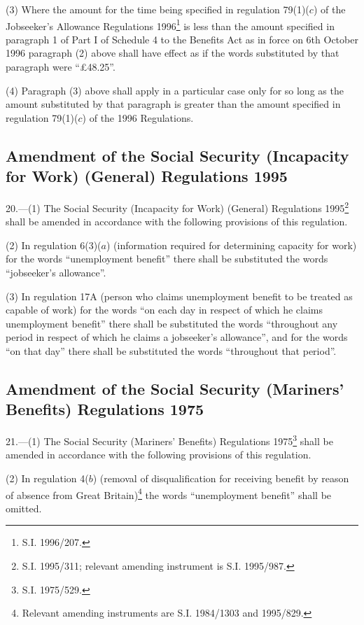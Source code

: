\documentclass[a4paper]{article}
\begin{document}
(3) Where the amount for the time being specified in regulation 79(1)($c$) of the Jobseeker’s Allowance Regulations 1996\footnote{\frenchspacing S.I. 1996/207.} is less than the amount specified in paragraph 1 of Part I of Schedule 4 to the Benefits Act as in force on 6th October 1996 paragraph (2) above shall have effect as if the words substituted by that paragraph were “£48.25”.

(4) Paragraph (3) above shall apply in a particular case only for so long as the amount substituted by that paragraph is greater than the amount specified in regulation 79(1)($c$) of the 1996 Regulations.

\subsection[20. Amendment of the Social Security (Incapacity for Work) (General) Regulations 1995]{Amendment of the Social Security (Incapacity for Work) (General) Regulations 1995}

20.—(1) The Social Security (Incapacity for Work) (General) Regulations 1995\footnote{\frenchspacing S.I. 1995/311; relevant amending instrument is S.I. 1995/987.} shall be amended in accordance with the following provisions of this regulation.

(2) In regulation 6(3)($a$) (information required for determining capacity for work) for the words “unemployment benefit” there shall be substituted the words “jobseeker’s allowance”.

(3) In regulation 17A (person who claims unemployment benefit to be treated as capable of work) for the words “on each day in respect of which he claims unemployment benefit” there shall be substituted the words “throughout any period in respect of which he claims a jobseeker’s allowance”, and for the words “on that day” there shall be substituted the words “throughout that period”.

\subsection[21. Amendment of the Social Security (Mariners' Benefits) Regulations 1975]{Amendment of the Social Security (Mariners' Benefits) Regulations 1975}

21.—(1) The Social Security (Mariners' Benefits) Regulations 1975\footnote{\frenchspacing S.I. 1975/529.} shall be amended in accordance with the following provisions of this regulation.

(2) In regulation 4($b$) (removal of disqualification for receiving benefit by reason of absence from Great Britain)\footnote{\frenchspacing Relevant amending instruments are S.I. 1984/1303 and 1995/829.} the words “unemployment benefit” shall be omitted.
\end{document}
